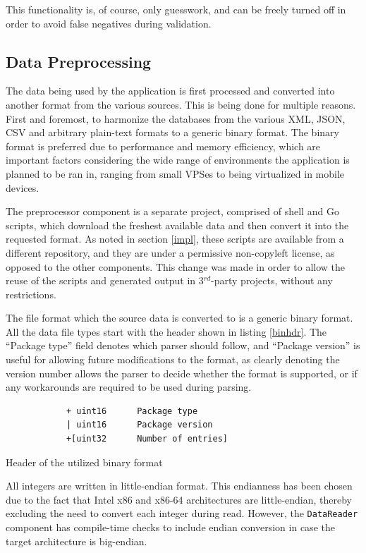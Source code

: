 \documentclass[a4paper,12pt]{article}
\begin{document}
	This functionality is, of course, only guesswork, and can be freely turned off in order to avoid false negatives during validation.

\subsection{Data Preprocessing} \label{preproc}
 

	The data being used by the application is first processed and converted into another format from the various sources. This is being done for multiple reasons. First and foremost, to harmonize the databases from the various XML, JSON, CSV and arbitrary plain-text formats to a generic binary format. The binary format is preferred due to performance and memory efficiency, which are important factors considering the wide range of environments the application is planned to be ran in, ranging from small VPSes to being virtualized in mobile devices\cite{nethunter14}.
	
	The preprocessor component is a separate project, comprised of shell and Go scripts, which download the freshest available data and then convert it into the requested format. As noted in section \ref{impl}, these scripts are available from a different repository, and they are under a permissive non-copyleft license, as opposed to the other components. This change was made in order to allow the reuse of the scripts and generated output in 3$^{rd}$-party projects, without any restrictions.

	The file format which the source data is converted to is a generic binary format. All the data file types start with the header shown in listing \ref{binhdr}. The ``Package type'' field denotes which parser should follow, and ``Package version'' is useful for allowing future modifications to the format, as clearly denoting the version number allows the parser to decide whether the format is supported, or if any workarounds are required to be used during parsing.

	\begin{listing}[H]
		\begin{verbatim}
			+ uint16      Package type
			| uint16      Package version
			+[uint32      Number of entries]
		\end{verbatim}
		\caption{Header of the utilized binary format}
		\label{binhdr}
	\end{listing}

	All integers are written in little-endian format. This endianness has been chosen due to the fact that Intel x86 and x86-64 architectures are little-endian, thereby excluding the need to convert each integer during read. However, the \texttt{DataReader} component has compile-time checks to include endian conversion in case the target architecture is big-endian.
\end{document}
